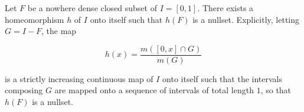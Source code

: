 Let $F$ be a nowhere dense closed subset of $I = [0, 1]$. There exists a homeomorphism $h$ of $I$ onto itself such that $h(F)$ is a nullset. Explicitly, letting $G = I - F$, the map

$$h(x) = \frac{m([0, x] \cap G)}{m(G)}$$

is a strictly increasing continuous map of $I$ onto itself such that the intervals composing $G$ are mapped onto a sequence of intervals of total length $1$, so that $h(F)$ is a nullset.
